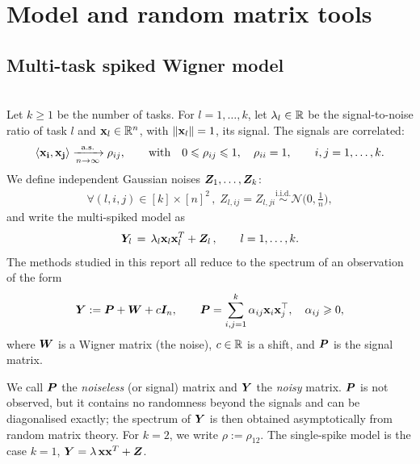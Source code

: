 \section{Model and random matrix tools}\label{sec:model}

\subsection{Multi-task spiked Wigner model}

\begin{defn}\leavevmode\\
    Let $k\ge1$ be the number of tasks. For $l = 1,\dots,k$, let $\lambda_l \in {\mathbb R}$ be the signal-to-noise ratio of task $l$ and $\boldsymbol{\mathbf{x}}_l \in {\mathbb R}^n$, with $ \|\boldsymbol{\mathbf{x}}_l \| = 1$, its signal. The signals are correlated:
    \[
    \langle \boldsymbol{\mathbf{x_i}},\boldsymbol{\mathbf{x_j}}\rangle \xrightarrow[n\to\infty]{\text{a.s.}} \rho_{ij}, \qquad \text{with} \quad 0 \leqslant \rho_{ij} \leqslant 1, \quad \rho_{ii} = 1, \qquad i,j = 1,\dots,k.
    \]
    We define independent Gaussian noises $\bm{Z}_1,\dots,\bm{Z}_k$:
    \begin{align}
        \forall (l,i,j) \in [k]\times[n]^2 \,, \; Z_{l,ij} = Z_{l,ji} \overset{\mathrm{i.i.d.}}{\sim} \mathcal{N}\bigg(0,\frac{1}{n}\bigg) ,
    \end{align}
    and write the multi-spiked model as
    \begin{align}
        \bm{Y}_l \, = \, \lambda_l \boldsymbol{\mathbf{x}}_l \boldsymbol{\mathbf{x}}_l^T + \bm{Z}_l \, , \qquad l = 1,\dots,k.
    \end{align}
    \noindent
    The methods studied in this report all reduce to the spectrum of an observation of the form
    \begin{equation}
    \bm{Y} := \bm{P} + \bm{W} + c \bm{I}_n,
    \qquad
    \bm{P} = \sum_{i,j = 1}^k \alpha_{ij} \boldsymbol{\mathbf{x}}_i \boldsymbol{\mathbf{x}}_j^\top, \quad \alpha_{ij} \geqslant 0,
    \label{eq:observation}
    \end{equation}
    where $\bm{W}$ is a Wigner matrix (the noise), $c \in {\mathbb R}$ is a shift, and $\bm{P}$ is the signal matrix.
\end{defn}
\noindent
We call $\bm{P}$ the \emph{noiseless} (or signal) matrix and $\bm{Y}$ the \emph{noisy} matrix. $\bm{P}$ is not observed, but it contains no randomness beyond the signals and can be diagonalised exactly; the spectrum of $\bm{Y}$ is then obtained asymptotically from random matrix theory. For $k = 2$, we write $\rho := \rho_{12}$. The single-spike model is the case $k=1$, $\bm{Y} = \lambda\,\boldsymbol{\mathbf{x}}\boldsymbol{\mathbf{x}}^T + \bm{Z}$.

